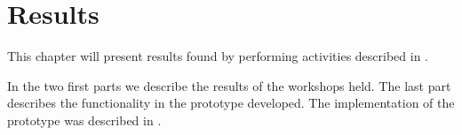 
\chapter{Results}
\label{chapter:results}
This chapter will present results found by performing activities described in
 . 

In the two first parts we describe the results of the workshops held. The last 
part describes the functionality in the prototype developed. The implementation
of the prototype was described in  .



